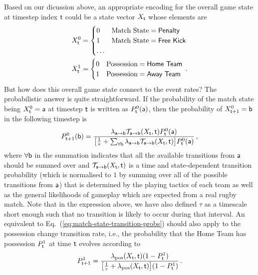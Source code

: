 Based on our dicussion above, an appropriate encoding for the overall game state at timestep index ${\sf t}$ could be a state vector $X_{{\sf t}}$ whose elements are
\begin{align}
X^0_{{\sf t}}&=\begin{cases} 0 & \text{Match State} = \text{{\sf Penalty}}\\ 1 & \text{Match State} = \text{{\sf Free Kick}} \\ \dots & \end{cases} \\
X^1_{{\sf t}}&=\begin{cases} 0 & \text{Possession} = \text{{\sf Home Team}}\\ 1 & \text{Possession} = \text{{\sf Away Team}} \end{cases} \,.
\end{align}
But how does this overall game state connect to the event rates? The probabilistic answer is quite straightforward. If the probability of the match state being $X^0_{{\sf t}}={\sf a}$ at timestep ${\sf t}$ is written as $P^0_{{\sf t}}({\sf a})$, then the probability of $X^0_{{\sf t}+1}={\sf b}$ in the following timestep is
\begin{align}
P^0_{{\sf t}+1}({\sf b}) = \frac{\lambda_{{\sf a}\rightarrow {\sf b}}{\cal T}_{{\sf a}\rightarrow {\sf b}}(X_{\sf t}, {\sf t})P^0_{{\sf t}}({\sf a})}{\big[ \frac{1}{\tau} + \sum_{\forall {\sf b}}\lambda_{{\sf a}\rightarrow {\sf b}} {\cal T}_{{\sf a}\rightarrow {\sf b}}(X_{\sf t}, {\sf t})\big] P^0_{{\sf t}}({\sf a})} \label{eq:match-state-transition-probs}\,,
\end{align}
where $\forall {\sf b}$ in the summation indicates that all the available transitions from ${\sf a}$ should be summed over and ${\cal T}_{{\sf a}\rightarrow {\sf b}}(X_{\sf t}, {\sf t})$ is a time and state-dependent transition probability (which is normalised to $1$ by summing over all of the possible transitions from ${\sf a}$) that is determined by the playing tactics of each team as well as the general likelihoods of gameplay which are expected from a real rugby match. Note that in the expression above, we have also defined $\tau$ as a timescale short enough such that no transition is likely to occur during that interval. An equivalent to Eq.~(\ref{eq:match-state-transition-probs}) should also apply to the possession change transition rate, i.e., the probability that the {\sf Home Team} has possession $P^1_{{\sf t}}$ at time ${\sf t}$ evolves according to
\begin{align}
P^1_{{\sf t}+1} = \frac{\lambda_{\rm pos}(X_{\sf t}, {\sf t}) (1-P^1_{{\sf t}})}{\big[ \frac{1}{\tau} + \lambda_{\rm pos}(X_{\sf t}, {\sf t})\big] (1-P^1_{{\sf t}})} \label{eq:possession-change-probs}\,.
\end{align}

